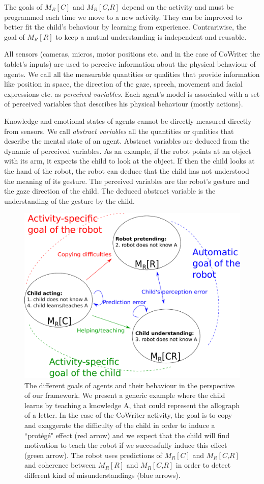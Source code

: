\documentclass[10pt,a4paper]{article}
\begin{document}
The goals of $ M_R\left[\textit{C}\right]$ and $ M_R\left[\textit{C,R}\right]$ depend on the activity and must be programmed each time we move to a new activity. They can be improved to better fit the child's behaviour by learning from experience. Contrariwise, the goal of $ M_R\left[\textit{R}\right]$ to keep a mutual understanding is independent and reusable. 

All sensors (cameras, micros, motor positions etc. and in the case of CoWriter the tablet's inputs) are used to perceive information about the physical behaviour of agents. 
We call all the measurable quantities or qualities that provide information like position in space, the direction of the gaze, speech, movement and facial expressions etc. as \textit{perceived variables}. 
Each agent's model is associated with a set of perceived variables that describes his physical behaviour (mostly actions).

Knowledge and emotional states of agents cannot be directly measured directly from sensors. 
We call \textit{abstract variables} all the quantities or qualities that describe the mental state of an agent. 
Abstract variables are deduced from the dynamic of perceived variables. 
As an example, if the robot points at an object with its arm, it expects the child to look at the object. 
If then the child looks at the hand of the robot, the robot can deduce that the child has not understood the meaning of its gesture. 
The perceived variables are the robot's gesture and the gaze direction of the child. 
The deduced abstract variable is the understanding of the gesture by the child. 


\begin{figure}[!]
\centering
\includegraphics[width=0.6\columnwidth]{mutual_behaviour}
\caption{\small The different goals of agents and their behaviour in the perspective of our framework. We present a generic example where the child learns by teaching a knowledge A, that could represent the allograph of a letter. In the case of the CoWriter activity, the goal is to copy and exaggerate the difficulty of the child in order to induce a ``prot\'eg\'e" effect (red arrow) and we expect that the child will find motivation to teach the robot if we successfully induce this effect (green arrow). The robot uses predictions of $ M_R\left[\textit{C}\right]$ and $ M_R\left[\textit{C,R}\right]$ and coherence between $ M_R\left[\textit{R}\right]$ and $ M_R\left[\textit{C,R}\right]$ in order to detect different kind of misunderstandings (blue arrows).}
\label{mm}
\end{figure} 
\end{document}
